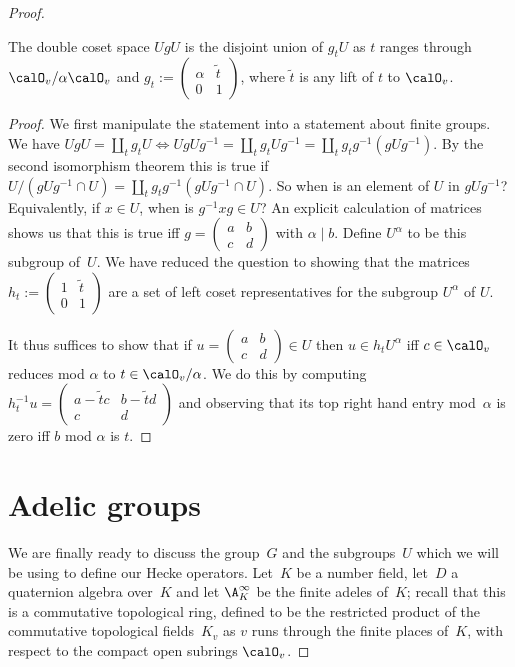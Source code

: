 \begin{proof}
\begin{lemma}
  \label{nolean-U1-coset-decomposition}
  The double coset space $UgU$ is the disjoint union of $g_tU$ as $t$ ranges
  through $\calO_v/\alpha\calO_v$ and $g_t:=\begin{pmatrix}\alpha&\tilde{t}\\0&1\end{pmatrix}$,
  where $\tilde{t}$ is any lift of $t$ to $\calO_v$.
\end{lemma}
\begin{proof} We first manipulate the statement into a statement about finite groups.
  We have $UgU=\coprod_t g_tU\iff UgUg^{-1}=\coprod_t g_tUg^{-1}=\coprod_t g_tg^{-1}(gUg^{-1})$.
  By the second isomorphism theorem this is true if
  $U/(gUg^{-1}\cap U)=\coprod_t g_tg^{-1}(gUg^{-1}\cap U)$. So when is an element of $U$
  in $gUg^{-1}$? Equivalently, if $x\in U$, when is $g^{-1}xg\in U$? An explicit calculation
  of matrices shows us that this is true iff $g=\begin{pmatrix} a&b\\c&d\end{pmatrix}$ with
  $\alpha\mid b$. Define $U^\alpha$ to be this subgroup of~$U$. We have reduced the question
  to showing that the matrices $h_t:=\begin{pmatrix}1&\tilde{t}\\0&1\end{pmatrix}$
  are a set of left coset representatives for the subgroup $U^\alpha$ of $U$.

  It thus suffices to show that if $u=\begin{pmatrix} a&b\\c&d\end{pmatrix}\in U$
  then $u\in h_tU^\alpha$ iff $c\in\calO_v$ reduces mod $\alpha$ to $t\in\calO_v/\alpha$.
  We do this by computing $h_t^{-1}u=\begin{pmatrix} a-\tilde{t}c&b-\tilde{t}d\\c&d\end{pmatrix}$
  and observing that its top right hand entry mod~$\alpha$ is zero iff $b$ mod $\alpha$ is $t$.
\end{proof}

\section{Adelic groups}

We are finally ready to discuss the group~$G$ and the subgroups~$U$ which we will be
using to define our Hecke operators. Let~$K$ be a number field, let~$D$ a quaternion algebra
over~$K$ and let $\A_K^\infty$ be the finite adeles of~$K$; recall that this is a commutative
topological ring, defined to be the restricted
product of the commutative topological fields~$K_v$ as $v$ runs through the finite places
of~$K$, with respect to the compact open subrings $\calO_v$.


\end{proof}
